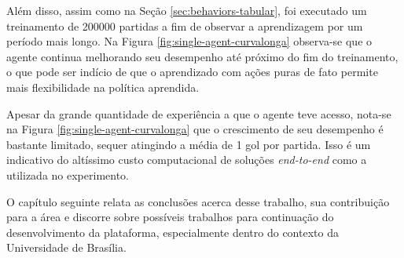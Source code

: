Além disso, assim como na Seção \ref{sec:behaviors-tabular}, foi executado um treinamento de 200000 partidas a fim de observar a aprendizagem por um período mais longo. Na Figura \ref{fig:single-agent-curvalonga} observa-se que o agente continua melhorando seu desempenho até próximo do fim do treinamento, o que pode ser indício de que o aprendizado com ações puras de fato permite mais flexibilidade na política aprendida.

Apesar da grande quantidade de experiência a que o agente teve acesso, nota-se na Figura \ref{fig:single-agent-curvalonga} que o crescimento de seu desempenho é bastante limitado, sequer atingindo a média de 1 gol por partida. Isso é um indicativo do altíssimo custo computacional de soluções \textit{end-to-end} como a utilizada no experimento.

O capítulo seguinte relata as conclusões acerca desse trabalho, sua contribuição para a área e discorre sobre possíveis trabalhos para continuação do desenvolvimento da plataforma, especialmente dentro do contexto da Universidade de Brasília.


 



